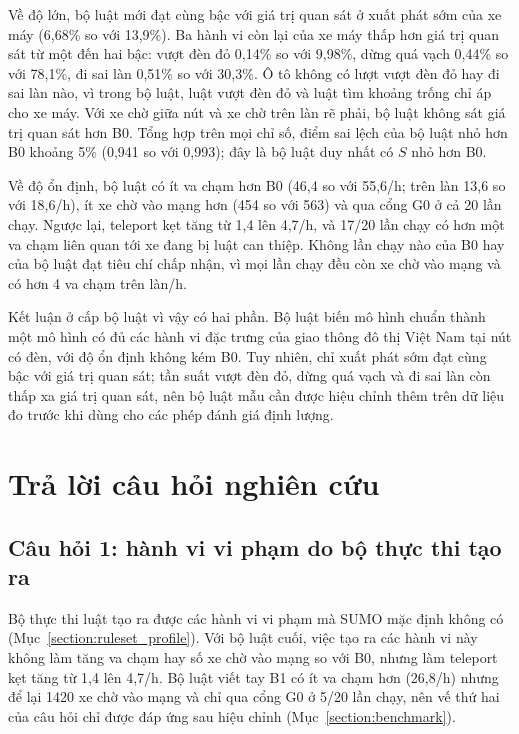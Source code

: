 \documentclass[../main.tex]{subfiles}
\begin{document}
Về độ lớn, bộ luật mới đạt cùng bậc với giá trị quan sát ở xuất phát sớm của xe máy (6,68\% so với 13,9\%). Ba hành vi còn lại của xe máy thấp hơn giá trị quan sát từ một đến hai bậc: vượt đèn đỏ 0,14\% so với 9,98\%, dừng quá vạch 0,44\% so với 78,1\%, đi sai làn 0,51\% so với 30,3\%. Ô tô không có lượt vượt đèn đỏ hay đi sai làn nào, vì trong bộ luật, luật vượt đèn đỏ và luật tìm khoảng trống chỉ áp cho xe máy. Với xe chờ giữa nút và xe chờ trên làn rẽ phải, bộ luật không sát giá trị quan sát hơn B0. Tổng hợp trên mọi chỉ số, điểm sai lệch của bộ luật nhỏ hơn B0 khoảng 5\% (0,941 so với 0,993); đây là bộ luật duy nhất có $S$ nhỏ hơn B0.

Về độ ổn định, bộ luật có ít va chạm hơn B0 (46,4 so với 55,6/h; trên làn 13,6 so với 18,6/h), ít xe chờ vào mạng hơn (454 so với 563) và qua cổng G0 ở cả 20 lần chạy. Ngược lại, teleport kẹt tăng từ 1,4 lên 4,7/h, và 17/20 lần chạy có hơn một va chạm liên quan tới xe đang bị luật can thiệp. Không lần chạy nào của B0 hay của bộ luật đạt tiêu chí chấp nhận, vì mọi lần chạy đều còn xe chờ vào mạng và có hơn 4 va chạm trên làn/h.

Kết luận ở cấp bộ luật vì vậy có hai phần. Bộ luật biến mô hình chuẩn thành một mô hình có đủ các hành vi đặc trưng của giao thông đô thị Việt Nam tại nút có đèn, với độ ổn định không kém B0. Tuy nhiên, chỉ xuất phát sớm đạt cùng bậc với giá trị quan sát; tần suất vượt đèn đỏ, dừng quá vạch và đi sai làn còn thấp xa giá trị quan sát, nên bộ luật mẫu cần được hiệu chỉnh thêm trên dữ liệu đo trước khi dùng cho các phép đánh giá định lượng.

\section{Trả lời câu hỏi nghiên cứu}

\subsection{Câu hỏi 1: hành vi vi phạm do bộ thực thi tạo ra}

Bộ thực thi luật tạo ra được các hành vi vi phạm mà SUMO mặc định không có (Mục~\ref{section:ruleset_profile}). Với bộ luật cuối, việc tạo ra các hành vi này không làm tăng va chạm hay số xe chờ vào mạng so với B0, nhưng làm teleport kẹt tăng từ 1,4 lên 4,7/h. Bộ luật viết tay B1 có ít va chạm hơn (26,8/h) nhưng để lại 1420 xe chờ vào mạng và chỉ qua cổng G0 ở 5/20 lần chạy, nên vế thứ hai của câu hỏi chỉ được đáp ứng sau hiệu chỉnh (Mục~\ref{section:benchmark}).
\end{document}
